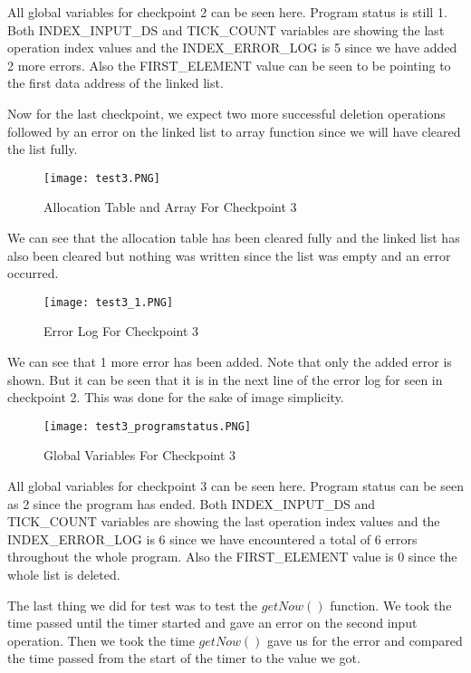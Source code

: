 \documentclass[pdftex,12pt,a4paper]{article}
\begin{document}
All global variables for checkpoint 2 can be seen here. Program status is still 1. Both INDEX\_INPUT\_DS  and TICK\_COUNT variables are showing the last operation index values and the INDEX\_ERROR\_LOG is 5 since we have added 2 more errors. Also the FIRST\_ELEMENT value can be seen to be pointing to the first data address of the linked list.

Now for the last checkpoint, we expect two more successful deletion operations followed by an error on the linked list to array function since we will have cleared the list fully.

\begin{figure}[H]
	\centering
	\texttt{[image: test3.PNG]}	
	\caption{Allocation Table and Array For Checkpoint 3}
	\label{fig1}
\end{figure}

We can see that the allocation table has been cleared fully and the linked list has also been cleared but nothing was written since the list was empty and an error occurred.

\begin{figure}[H]
	\centering
	\texttt{[image: test3\_1.PNG]}	
	\caption{Error Log For Checkpoint 3}
	\label{fig1}
\end{figure}

We can see that 1 more error has been added. Note that only the added error is shown. But it can be seen that it is in the next line of the error log for seen in checkpoint 2. This was done for the sake of image simplicity.

\begin{figure}[H]
	\centering
	\texttt{[image: test3\_programstatus.PNG]}	
	\caption{Global Variables For Checkpoint 3}
	\label{fig1}
\end{figure}

All global variables for checkpoint 3 can be seen here. Program status can be seen as 2 since the program has ended. Both INDEX\_INPUT\_DS  and TICK\_COUNT variables are showing the last operation index values and the INDEX\_ERROR\_LOG is 6 since we have encountered a total of 6 errors throughout the whole program. Also the FIRST\_ELEMENT value is 0 since the whole list is deleted.

The last thing we did for test was to test the $getNow()$ function. We took the time passed until the timer started and gave an error on the second input operation. Then we took the time $getNow()$ gave us for the error and compared the time passed from the start of the timer to the value we got.
\end{document}

